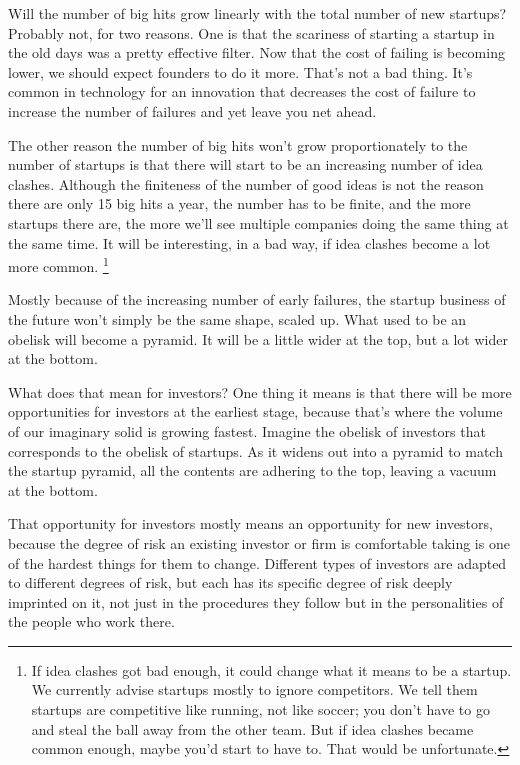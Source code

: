 \documentclass[12pt]{book}
\begin{document}
Will the number of big hits grow linearly with the total number of new
startups? Probably not, for two reasons. One is that the scariness of
starting a startup in the old days was a pretty effective filter. Now
that the cost of failing is becoming lower, we should expect founders to
do it more. That's not a bad thing. It's common in technology for an
innovation that decreases the cost of failure to increase the number of
failures and yet leave you net ahead.

The other reason the number of big hits won't grow proportionately to
the number of startups is that there will start to be an increasing
number of idea clashes. Although the finiteness of the number of good
ideas is not the reason there are only 15 big hits a year, the number
has to be finite, and the more startups there are, the more we'll see
multiple companies doing the same thing at the same time. It will be
interesting, in a bad way, if idea clashes become a lot more common.
\footnote{If idea clashes got bad enough, it could change what it means to
be a startup. We currently advise startups mostly to ignore competitors.
We tell them startups are competitive like running, not like soccer; you
don't have to go and steal the ball away from the other team. But if
idea clashes became common enough, maybe you'd start to have to. That
would be unfortunate.}

Mostly because of the increasing number of early failures, the startup
business of the future won't simply be the same shape, scaled up. What
used to be an obelisk will become a pyramid. It will be a little wider
at the top, but a lot wider at the bottom.

What does that mean for investors? One thing it means is that there will
be more opportunities for investors at the earliest stage, because
that's where the volume of our imaginary solid is growing fastest.
Imagine the obelisk of investors that corresponds to the obelisk of
startups. As it widens out into a pyramid to match the startup pyramid,
all the contents are adhering to the top, leaving a vacuum at the
bottom.

That opportunity for investors mostly means an opportunity for new
investors, because the degree of risk an existing investor or firm is
comfortable taking is one of the hardest things for them to change.
Different types of investors are adapted to different degrees of risk,
but each has its specific degree of risk deeply imprinted on it, not
just in the procedures they follow but in the personalities of the
people who work there.
\end{document}
